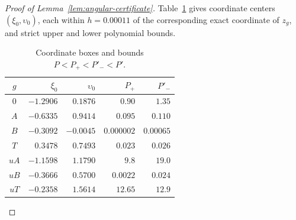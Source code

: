 \begin{proof}[Proof of Lemma~\ref{lem:angular-certificate}]
Table~\ref{tab:angular-coordinates} gives coordinate centers
\((\xi_0,\upsilon_0)\), each within \(h=0.00011\) of
the corresponding exact coordinate of \(z_g\), and strict
upper and lower polynomial bounds.
\begin{table}[htbp]
\centering
\begin{tabular}{@{}crrrr@{}}
\toprule
\(g\)&\(\xi_0\)&\(\upsilon_0\)&\(P_+\)&\(P'_-\)\\
\midrule
\(0\)&\(-1.2906\)&\(0.1876\)&\(0.90\)&\(1.35\)\\
\(A\)&\(-0.6335\)&\(0.9414\)&\(0.095\)&\(0.110\)\\
\(B\)&\(-0.3092\)&\(-0.0045\)&\(0.000002\)&\(0.00065\)\\
\(T\)&\(0.3478\)&\(0.7493\)&\(0.023\)&\(0.026\)\\
\(uA\)&\(-1.1598\)&\(1.1790\)&\(9.8\)&\(19.0\)\\
\(uB\)&\(-0.3666\)&\(0.5700\)&\(0.0022\)&\(0.024\)\\
\(uT\)&\(-0.2358\)&\(1.5614\)&\(12.65\)&\(12.9\)\\
\bottomrule
\end{tabular}
\caption{Coordinate boxes and bounds \(P<P_+<P'_-<P'\).}
\label{tab:angular-coordinates}
\end{table}


\end{proof}
